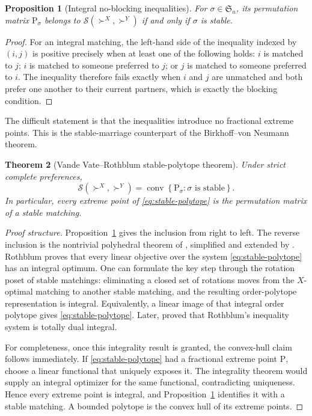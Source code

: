 \documentclass[11pt]{article}
\newtheorem{theorem}{Theorem}[section]
\newtheorem{proposition}[theorem]{Proposition}
\theoremstyle{definition}
\theoremstyle{remark}
\newcommand{\Perm}{\mathfrak S}
\newcommand{\Pmat}{\mathrm P}
\newcommand{\Scal}{\mathcal S}
\begin{document}
\begin{proposition}[Integral no-blocking inequalities]\label{prop:integral-stability}
For \(\sigma\in\Perm_n\), its permutation matrix \(\Pmat_\sigma\) belongs to
\(\Scal(\succ^X,\succ^Y)\) if and only if \(\sigma\) is stable.
\end{proposition}

\begin{proof}
For an integral matching, the left-hand side of the inequality indexed by
\((i,j)\) is positive precisely when at least one of the following holds:
\(i\) is matched to \(j\); \(i\) is matched to someone preferred to \(j\); or
\(j\) is matched to someone preferred to \(i\). The inequality therefore fails
exactly when \(i\) and \(j\) are unmatched and both prefer one another to their
current partners, which is exactly the blocking condition.
\end{proof}

The difficult statement is that the inequalities introduce no fractional
extreme points. This is the stable-marriage counterpart of the
Birkhoff--von Neumann theorem.

\begin{theorem}[Vande Vate--Rothblum stable-polytope theorem]
\label{thm:stable-polytope}
Under strict complete preferences,
\begin{equation}\label{eq:stable-convex-hull}
  \Scal(\succ^X,\succ^Y)
  =\operatorname{conv}\left\{\Pmat_\sigma:
  \sigma\text{ is stable}\right\}.
\end{equation}
In particular, every extreme point of \eqref{eq:stable-polytope} is the
permutation matrix of a stable matching.
\end{theorem}

\begin{proof}[Proof structure]
Proposition~\ref{prop:integral-stability} gives the inclusion from right to
left. The reverse inclusion is the nontrivial polyhedral theorem of
\citet{VandeVate1989}, simplified and extended by \citet{Rothblum1992}.
Rothblum proves that every linear objective over the system
\eqref{eq:stable-polytope} has an integral optimum. One can formulate the key
step through the rotation poset of stable matchings: eliminating a closed set
of rotations moves from the \(X\)-optimal matching to another stable matching,
and the resulting order-polytope representation is integral. Equivalently, a
linear image of that integral order polytope gives
\eqref{eq:stable-polytope}. Later, \citet{KiralPap2008} proved that Rothblum's
inequality system is totally dual integral.

For completeness, once this integrality result is granted, the convex-hull
claim follows immediately. If \eqref{eq:stable-polytope} had a fractional
extreme point \(\Pmat\), choose a linear functional that uniquely exposes it.
The integrality theorem would supply an integral optimizer for the same
functional, contradicting uniqueness. Hence every extreme point is integral,
and Proposition~\ref{prop:integral-stability} identifies it with a stable
matching. A bounded polytope is the convex hull of its extreme points.
\end{proof}
\end{document}

